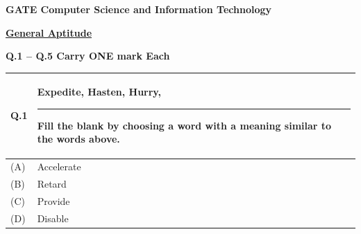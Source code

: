 \documentclass[14pt]{article}
\renewcommand{\arraystretch}{1.25}
\begin{document}
\begin{center}
    \textbf{\Large GATE Computer Science and Information Technology}
\end{center}

\vspace{0.3cm}

\noindent \textbf{\underline{General Aptitude}}

\vspace{0.3cm}

\noindent
\textbf{Q.1 -- Q.5 Carry ONE mark Each}

\vspace{0.5cm}

\renewcommand{\arraystretch}{1.8}

\begin{tabular}{|p{1.5cm}|p{12cm}|}
\hline

\textbf{Q.1} &
Expedite, Hasten, Hurry, \rule{3cm}{0.4pt}

\vspace{0.3cm}

Fill the blank by choosing a word with a meaning similar to the words above.
\\
\hline

(A) & Accelerate \\
\hline

(B) & Retard \\
\hline

(C) & Provide \\
\hline

(D) & Disable \\
\hline

\end{tabular}

\vspace{0.5cm}

\renewcommand{\arraystretch}{1.8}
\end{document}
